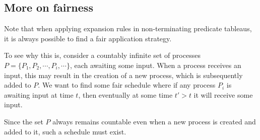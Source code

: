 \subsection{More on fairness}

Note that when applying expansion rules in non-terminating predicate tableaus, it is always possible to find a fair application strategy.

To see why this is, consider a countably infinite set of processes \(P = \{P_1, P_2, \cdots, P_i, \cdots\}\), each awaiting some input. When a process receives an input, this may result in the creation of a new process, which is subsequently added to \(P\). We want to find some fair schedule where if any process \(P_i\) is awaiting input at time \(t\), then eventually at some time \(t' > t\) it will receive some input.

Since the set \(P\) always remains countable even when a new process is created and added to it, such a schedule must exist.